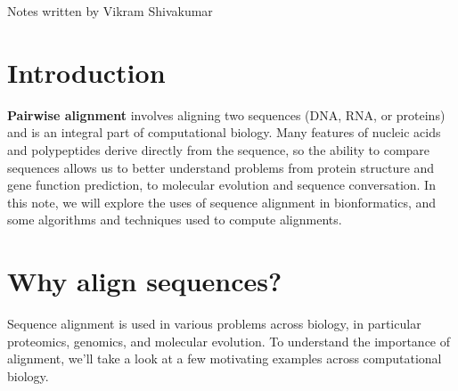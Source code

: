 \documentclass[12pt]{article}
\begin{document}
\thispagestyle{plain}
   \newpage
   \setcounter{page}{1}
   \noindent
   \begin{center}
   \end{center}
   {Notes written by Vikram Shivakumar}
   \vspace*{4mm}


\section{Introduction}
\textbf{Pairwise alignment} involves aligning two sequences (DNA, RNA, or proteins) and is an integral part of computational biology. Many features of nucleic acids and polypeptides derive directly from the sequence, so the ability to compare sequences allows us to better understand problems from protein structure and gene function prediction, to molecular evolution and sequence conversation. In this note, we will explore the uses of sequence alignment in bionformatics, and some algorithms and techniques used to compute alignments.

\section{Why align sequences?}
Sequence alignment is used in various problems across biology, in particular proteomics, genomics, and molecular evolution. To understand the importance of alignment, we'll take a look at a few motivating examples across computational biology.
\end{document}
